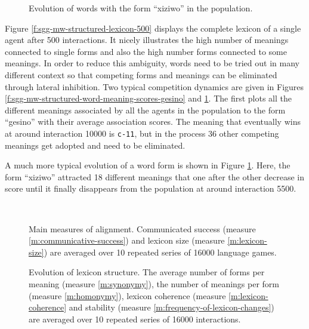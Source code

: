 \begin{figure}[t]
  \caption{Evolution of words with the form ``xiziwo'' in the
    population. }
  \label{f:sgg-mw-structured-word-meaning-scores-xiziwo}
\end{figure}

\stopfiguregroup


Figure \ref{f:sgg-mw-structured-lexicon-500} displays the complete
lexicon of a single agent after 500 interactions. It nicely
illustrates the high number of meanings connected to single forms and
also the high number forms connected to some meanings. In order to
reduce this ambiguity, words need to be tried out in many different
context so that competing forms and meanings can be eliminated through
lateral inhibition. Two typical competition dynamics are given in
Figures \ref{f:sgg-mw-structured-word-meaning-scores-gesino} and
\ref{f:sgg-mw-structured-word-meaning-scores-xiziwo}. The first plots
all the different meanings associated by all the agents in the
population to the form ``gesino'' with their average association
scores. The meaning that eventually wins at around interaction 10000
is \texttt{c-11}, but in the process 36 other competing meanings get
adopted and need to be eliminated. 

A much more typical evolution of a word form is shown in Figure
\ref{f:sgg-mw-structured-word-meaning-scores-xiziwo}. Here, the form
``xiziwo'' attracted 18 different meanings that one after the other
decrease in score until it finally disappears from the population at
around interaction 5500.

~\\

\startfiguregroup

\begin{figure}[t]
  \caption{Main measures of alignment. Communicated success (measure
    \ref{m:communicative-success}) and lexicon size (measure
    \ref{m:lexicon-size}) are averaged over 10 repeated series of 16000
    language games.}
  \label{f:sgg-mw-structured-success+lexicon-size}
\end{figure}


\begin{figure}[t]
  \caption{Evolution of lexicon structure. The average number of forms
    per meaning (measure \ref{m:synonymy}), the number of meanings per
    form (measure \ref{m:homonymy}), lexicon coherence (measure
    \ref{m:lexicon-coherence} and stability (measure
    \ref{m:frequency-of-lexicon-changes}) are averaged over 10
    repeated series of 16000 interactions.}
  \label{f:sgg-mw-structured-lexicon}
\end{figure}


